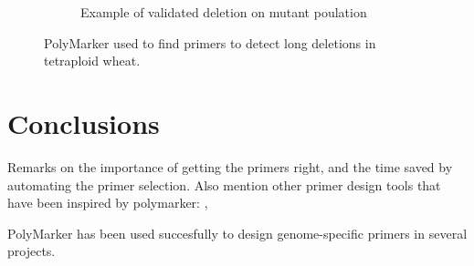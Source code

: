 \begin{figure}
\begin{subfigure}[b]{0.3\textwidth}
        \caption{Example of validated deletion on mutant poulation}
        \label{fig:poly:homTest}
    \end{subfigure}
    \caption{PolyMarker used to find primers to detect long deletions in tetraploid wheat.}
    \label{fig:poly:homDel}
\end{figure}



\section{Conclusions} Remarks on the importance of getting the primers right, and the time saved by automating the primer selection. Also mention other primer design tools that have been inspired by polymarker: \cite{Ma2015}, \cite{Wang2016}

PolyMarker has been used succesfully to design genome-specific primers in several projects. 


